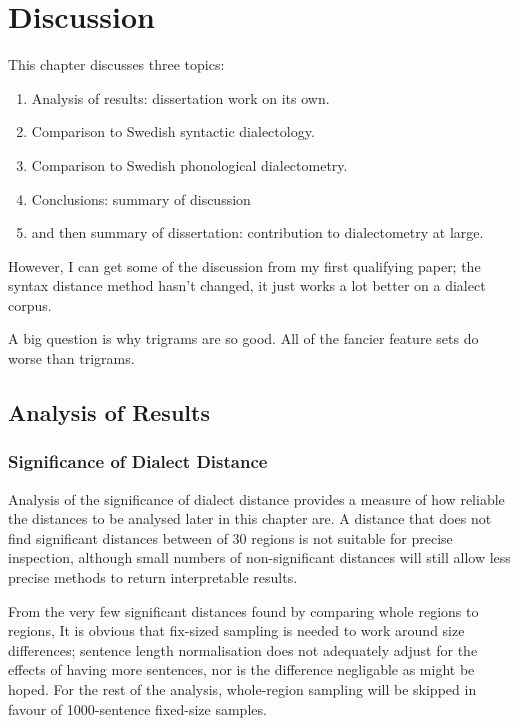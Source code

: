 \chapter{Discussion}

This chapter discusses three topics:

\begin{enumerate}
\item Analysis of results: dissertation work on its own.
\item Comparison to Swedish syntactic dialectology.
\item Comparison to Swedish phonological dialectometry.
\item Conclusions: summary of discussion
\item and then summary of dissertation: contribution to dialectometry at large.
\end{enumerate}

However, I can get some of the discussion from my first qualifying
paper; the syntax distance method hasn't changed, it just works a lot
better on a dialect corpus.

A big question is why trigrams are so good. All of the fancier feature
sets do worse than trigrams.


\section{Analysis of Results}


\subsection{Significance of Dialect Distance}

Analysis of the significance of dialect distance provides a measure of
how reliable the distances to be analysed later in this chapter are. A
distance that does not find significant distances between of 30
regions is not suitable for precise inspection, although small numbers
of non-significant distances will still allow less precise methods to
return interpretable results.

From the very few significant distances found by comparing whole
regions to regions, It is obvious that fix-sized sampling is needed to
work around size differences; sentence length normalisation does not
adequately adjust for the effects of having more sentences, nor is the
difference negligable as might be hoped. For the rest of the analysis,
whole-region sampling will be skipped in favour of 1000-sentence
fixed-size samples.

